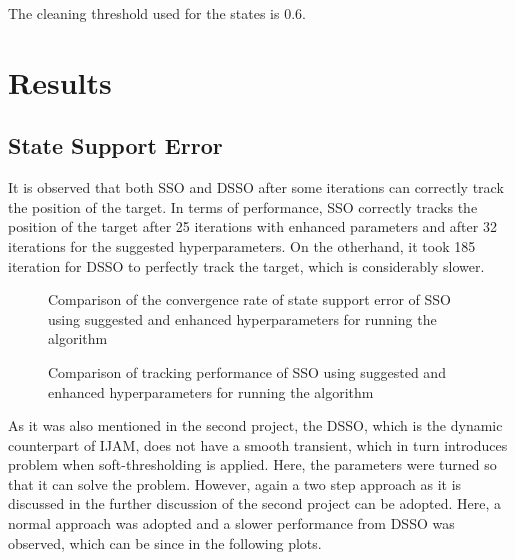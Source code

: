 The cleaning threshold used for the states is 0.6.

\section{Results}
\subsection{State Support Error}
It is observed that both SSO and DSSO after some iterations can correctly track the position of the target. In terms of performance, SSO correctly tracks the position of the target after 25 iterations with enhanced parameters and after 32 iterations for the suggested hyperparameters. On the otherhand, it took 185 iteration for DSSO to perfectly track the target, which is considerably slower.

\begin{figure}[H]
    \centering
    \hspace{1cm} %
    \caption{Comparison of the convergence rate of state support error of SSO using suggested and enhanced hyperparameters for running the algorithm}
\end{figure}

\begin{figure}[H]
    \centering
    \hspace{1cm} %
    \caption{Comparison of tracking performance of SSO using suggested and enhanced hyperparameters for running the algorithm}
\end{figure}

As it was also mentioned in the second project, the DSSO, which is the dynamic counterpart of IJAM, does not have a smooth transient, which in turn introduces problem when soft-thresholding is applied. Here, the parameters were turned so that it can solve the problem. However, again a two step approach as it is discussed in the further discussion of the second project can be adopted. Here, a normal approach was adopted and a slower performance from DSSO was observed, which can be since in the following plots.

